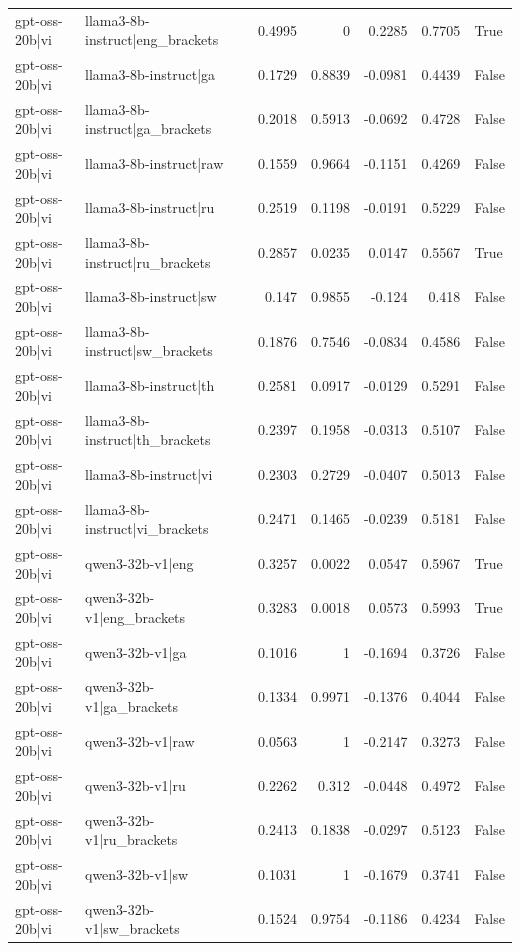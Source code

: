 \begin{table}
\begin{tabular}{l l r r r r l}
gpt-oss-20b|vi & llama3-8b-instruct|eng_brackets & 0.4995 & 0 & 0.2285 & 0.7705 & True \\
gpt-oss-20b|vi & llama3-8b-instruct|ga & 0.1729 & 0.8839 & -0.0981 & 0.4439 & False \\
gpt-oss-20b|vi & llama3-8b-instruct|ga_brackets & 0.2018 & 0.5913 & -0.0692 & 0.4728 & False \\
gpt-oss-20b|vi & llama3-8b-instruct|raw & 0.1559 & 0.9664 & -0.1151 & 0.4269 & False \\
gpt-oss-20b|vi & llama3-8b-instruct|ru & 0.2519 & 0.1198 & -0.0191 & 0.5229 & False \\
gpt-oss-20b|vi & llama3-8b-instruct|ru_brackets & 0.2857 & 0.0235 & 0.0147 & 0.5567 & True \\
gpt-oss-20b|vi & llama3-8b-instruct|sw & 0.147 & 0.9855 & -0.124 & 0.418 & False \\
gpt-oss-20b|vi & llama3-8b-instruct|sw_brackets & 0.1876 & 0.7546 & -0.0834 & 0.4586 & False \\
gpt-oss-20b|vi & llama3-8b-instruct|th & 0.2581 & 0.0917 & -0.0129 & 0.5291 & False \\
gpt-oss-20b|vi & llama3-8b-instruct|th_brackets & 0.2397 & 0.1958 & -0.0313 & 0.5107 & False \\
gpt-oss-20b|vi & llama3-8b-instruct|vi & 0.2303 & 0.2729 & -0.0407 & 0.5013 & False \\
gpt-oss-20b|vi & llama3-8b-instruct|vi_brackets & 0.2471 & 0.1465 & -0.0239 & 0.5181 & False \\
gpt-oss-20b|vi & qwen3-32b-v1|eng & 0.3257 & 0.0022 & 0.0547 & 0.5967 & True \\
gpt-oss-20b|vi & qwen3-32b-v1|eng_brackets & 0.3283 & 0.0018 & 0.0573 & 0.5993 & True \\
gpt-oss-20b|vi & qwen3-32b-v1|ga & 0.1016 & 1 & -0.1694 & 0.3726 & False \\
gpt-oss-20b|vi & qwen3-32b-v1|ga_brackets & 0.1334 & 0.9971 & -0.1376 & 0.4044 & False \\
gpt-oss-20b|vi & qwen3-32b-v1|raw & 0.0563 & 1 & -0.2147 & 0.3273 & False \\
gpt-oss-20b|vi & qwen3-32b-v1|ru & 0.2262 & 0.312 & -0.0448 & 0.4972 & False \\
gpt-oss-20b|vi & qwen3-32b-v1|ru_brackets & 0.2413 & 0.1838 & -0.0297 & 0.5123 & False \\
gpt-oss-20b|vi & qwen3-32b-v1|sw & 0.1031 & 1 & -0.1679 & 0.3741 & False \\
gpt-oss-20b|vi & qwen3-32b-v1|sw_brackets & 0.1524 & 0.9754 & -0.1186 & 0.4234 & False \\

\end{tabular}
\end{table}
